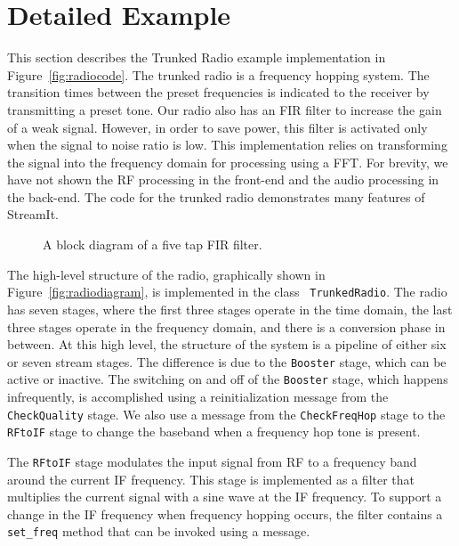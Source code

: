 \section{Detailed Example}
\label{sec:example}
This section describes the Trunked Radio example implementation in
Figure~\ref{fig:radiocode}. The trunked radio is a frequency hopping
system. The transition times between the preset frequencies is
indicated to the receiver by transmitting a preset tone.  Our radio
also has an FIR filter to increase the gain of a weak signal. However,
in order to save power, this filter is activated only when the signal
to noise ratio is low.  This implementation relies on transforming the
signal into the frequency domain for processing using a FFT. For
brevity, we have not shown the RF processing in the front-end and the
audio processing in the back-end.  The code for the trunked radio
demonstrates many features of StreamIt.

\begin{figure}[t]
\centering
{}
\vspace{-0.1in}
\caption{A block diagram of a five tap FIR filter.}
\label{fig:firfilter}
\vspace{-0.1in}
\end{figure}

The high-level structure of the radio, graphically shown in
Figure~\ref{fig:radiodiagram}, is implemented in the class {\tt
TrunkedRadio}. The radio has seven stages, where the first three
stages operate in the time domain, the last three stages operate in
the frequency domain, and there is a conversion phase in between.  At
this high level, the structure of the system is a pipeline of either
six or seven stream stages. The difference is due to the {\tt Booster}
stage, which can be active or inactive. The switching on and off of
the {\tt Booster} stage, which happens infrequently, is accomplished
using a reinitialization message from the {\tt CheckQuality} stage. We
also use a message from the {\tt CheckFreqHop} stage to the {\tt
RFtoIF} stage to change the baseband when a frequency hop tone is
present.

The {\tt RFtoIF} stage modulates the input signal from RF to a
frequency band around the current IF frequency. This stage is
implemented as a filter that multiplies the current signal with a sine
wave at the IF frequency.  To support a change in the IF frequency
when frequency hopping occurs, the filter contains a {\tt set\_freq}
method that can be invoked using a message.

